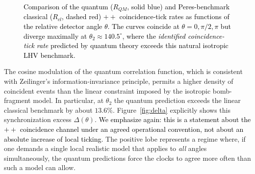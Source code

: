 \documentclass[reprint,aps,pra,longbibliography]{revtex4-2}
\newcommand{\rev}[1]{\textcolor{black}{#1}} %
\begin{document}
\begin{figure}[t]
\centering
{}
\caption{\rev{Comparison of the quantum ($R_{QM}$, solid blue) and Peres-benchmark classical ($R_{cl}$, dashed red) $++$ coincidence-tick rates as functions of the relative detector angle $\theta$. The curves coincide at $\theta = 0, \pi/2, \pi$ but diverge maximally at $\theta_2 \approx 140.5^\circ$, where the \emph{identified coincidence-tick rate} predicted by quantum theory exceeds this natural isotropic LHV benchmark.}}
\label{fig:rates}
\end{figure}

The cosine modulation of the quantum correlation function, which is consistent with Zeilinger's information-invariance principle, permits a higher density of coincident events than the linear constraint imposed by the isotropic bomb-fragment model. In particular, at $\theta_2$ the quantum prediction exceeds the linear classical benchmark by about $13.6\%$.
Figure~\ref{fig:delta} explicitly shows this synchronization excess $\Delta(\theta)$. \rev{We emphasize again: this is a statement about the $++$ coincidence channel under an agreed operational convention, not about an absolute increase of local ticking.} The positive lobe represents a regime where, if one demands a single local realistic model that applies to \emph{all} angles simultaneously, the quantum predictions force the clocks to agree more often than such a model can allow.
\end{document}
